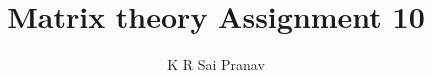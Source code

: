\documentclass[journal,12pt,twocolumn]{IEEEtran}
\begin{document}
\makeatletter
{}
\makeatother
\let\StandardTheFigure\thefigure
\let\vec\mathbf
\renewcommand{\thefigure}{\theproblem}
\def\putbox#1#2#3{\makebox[0in][l]{\makebox[#1][l]{}\raisebox{\baselineskip}[0in][0in]{\raisebox{#2}[0in][0in]{#3}}}}
     \def\rightbox#1{\makebox[0in][r]{#1}}
     \def\centbox#1{\makebox[0in]{#1}}
     \def\topbox#1{\raisebox{-\baselineskip}[0in][0in]{#1}}
     \def\midbox#1{\raisebox{-0.5\baselineskip}[0in][0in]{#1}}
\vspace{3cm}
\title{Matrix theory Assignment 10}
\author{K R Sai Pranav}
%
%
%
% 
%
\end{document}
